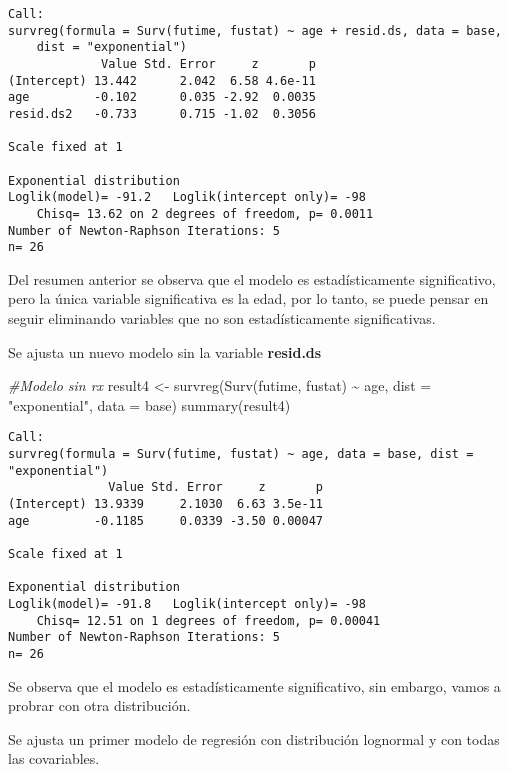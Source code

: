\documentclass[
]{article}
\newenvironment{Shaded}{\begin{snugshade}}{\end{snugshade}}
\newcommand{\AttributeTok}[1]{\textcolor[rgb]{0.77,0.63,0.00}{#1}}
\newcommand{\CommentTok}[1]{\textcolor[rgb]{0.56,0.35,0.01}{\textit{#1}}}
\newcommand{\FunctionTok}[1]{\textcolor[rgb]{0.00,0.00,0.00}{#1}}
\newcommand{\NormalTok}[1]{#1}
\newcommand{\OtherTok}[1]{\textcolor[rgb]{0.56,0.35,0.01}{#1}}
\newcommand{\SpecialCharTok}[1]{\textcolor[rgb]{0.00,0.00,0.00}{#1}}
\newcommand{\StringTok}[1]{\textcolor[rgb]{0.31,0.60,0.02}{#1}}
\begin{document}
\begin{verbatim}
Call:
survreg(formula = Surv(futime, fustat) ~ age + resid.ds, data = base, 
    dist = "exponential")
             Value Std. Error     z       p
(Intercept) 13.442      2.042  6.58 4.6e-11
age         -0.102      0.035 -2.92  0.0035
resid.ds2   -0.733      0.715 -1.02  0.3056

Scale fixed at 1 

Exponential distribution
Loglik(model)= -91.2   Loglik(intercept only)= -98
    Chisq= 13.62 on 2 degrees of freedom, p= 0.0011 
Number of Newton-Raphson Iterations: 5 
n= 26 
\end{verbatim}

Del resumen anterior se observa que el modelo es estadísticamente
significativo, pero la única variable significativa es la edad, por lo
tanto, se puede pensar en seguir eliminando variables que no son
estadísticamente significativas.

Se ajusta un nuevo modelo sin la variable \textbf{resid.ds}

\begin{Shaded}
\begin{Highlighting}[]
\CommentTok{\#Modelo sin rx}
\NormalTok{result4 }\OtherTok{\textless{}{-}} \FunctionTok{survreg}\NormalTok{(}\FunctionTok{Surv}\NormalTok{(futime, fustat) }\SpecialCharTok{\textasciitilde{}}\NormalTok{ age, }\AttributeTok{dist =} \StringTok{"exponential"}\NormalTok{, }\AttributeTok{data =}\NormalTok{ base)}
\FunctionTok{summary}\NormalTok{(result4)}
\end{Highlighting}
\end{Shaded}

\begin{verbatim}
Call:
survreg(formula = Surv(futime, fustat) ~ age, data = base, dist = "exponential")
              Value Std. Error     z       p
(Intercept) 13.9339     2.1030  6.63 3.5e-11
age         -0.1185     0.0339 -3.50 0.00047

Scale fixed at 1 

Exponential distribution
Loglik(model)= -91.8   Loglik(intercept only)= -98
    Chisq= 12.51 on 1 degrees of freedom, p= 0.00041 
Number of Newton-Raphson Iterations: 5 
n= 26 
\end{verbatim}

Se observa que el modelo es estadísticamente significativo, sin embargo,
vamos a probrar con otra distribución.


Se ajusta un primer modelo de regresión con distribución lognormal y con
todas las covariables.
\end{document}
